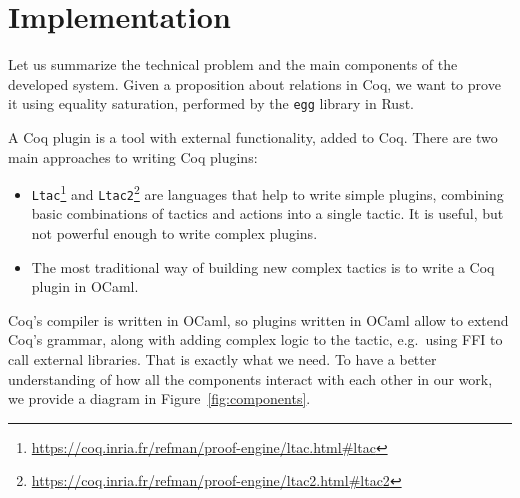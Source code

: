 \section{Implementation}
Let us summarize the technical problem and the main components of the developed system. Given a proposition about relations in Coq, we want to prove it using equality saturation, performed by the \texttt{egg} library in Rust. 

A Coq plugin is a tool with external functionality, added to Coq. There are two main approaches to writing Coq plugins: 
\begin{itemize}
    \item \texttt{Ltac}\footnote{\href{https://coq.inria.fr/refman/proof-engine/ltac.html\#ltac}{https://coq.inria.fr/refman/proof-engine/ltac.html\#ltac}} and \texttt{Ltac2}\footnote{\href{https://coq.inria.fr/refman/proof-engine/ltac2.html\#ltac2}{https://coq.inria.fr/refman/proof-engine/ltac2.html\#ltac2}} are languages that help to write simple plugins, combining basic combinations of tactics and actions into a single tactic. It is useful, but not powerful enough to write complex plugins.
    \item The most traditional way of building new complex tactics is to write a Coq plugin in OCaml.
\end{itemize}

Coq's compiler is written in OCaml, so plugins written in OCaml allow to extend Coq's grammar, along with adding complex logic to the tactic, e.g.\ using FFI to call external libraries. That is exactly what we need. To have a better understanding of how all the components interact with each other in our work, we provide a diagram in Figure~\ref{fig:components}.

